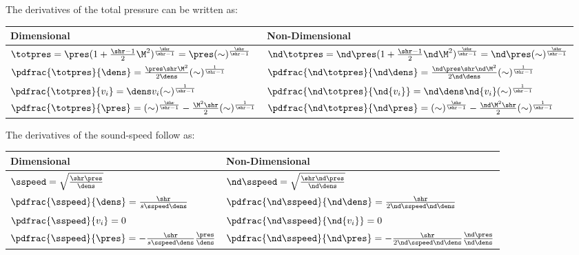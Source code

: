 \documentclass[../main.tex]{subfiles}
\begin{document}
The derivatives of the total pressure  can be written as:
\def\totpress  {$\totpres = \pres (1+\frac{\shr-1}{2} \M^2)^{\frac{\shr}{\shr-1}} = \pres (\sim)^{\frac{\shr}{\shr-1}}$}
\def\ndtotpress      {$\ndtotpres = \ndpres (1+\frac{\shr-1}{2} \ndM^2)^{\frac{\shr}{\shr-1}} = \ndpres (\sim)^{\frac{\shr}{\shr-1}}$}
\def\pdtotpressBYdens{$\pdfrac{\totpres}{\dens} =\frac{\pres \shr \M^2}{2 \dens} (\sim)^{\frac{1}{\shr-1}}$}
\def\pdtotpressBYvel {$\pdfrac{\totpres}{v_i}   = \dens v_i (\sim)^{\frac{1}{\shr-1}}$}
\def\pdtotpressBYpres    {$\pdfrac{\totpres}{\pres} = (\sim)^{\frac{\shr}{\shr-1}}-\frac{\M^2\shr}{2} (\sim)^{\frac{1}{\shr-1}}$}
\def\pdndtotpressBYnddens{$\pdfrac{\ndtotpres}{\nddens}  = \frac{\ndpres \shr \ndM^2}{2 \nddens} (\sim)^{\frac{1}{\shr-1}}$ }
\def\pdndtotpressBYndvel {$\pdfrac{\ndtotpres}{\nd{v_i}} = \nddens \nd{v_i} (\sim)^{\frac{1}{\shr-1}}$}
\def\pdndtotpressBYndpres{$\pdfrac{\ndtotpres}{\ndpres}  = (\sim)^{\frac{\shr}{\shr-1}}-\frac{\ndM^2\shr}{2} (\sim)^{\frac{1}{\shr-1}}$}
\begin{center}
\begin{tabular}{ m{} | m{} }\hline
\rowcolor{black!20} \textbf{Dimensional} &  \textbf{Non-Dimensional} \\ \hline
\totpress & \ndtotpress \\
\pdtotpressBYdens & \pdndtotpressBYnddens \\
\pdtotpressBYvel  & \pdndtotpressBYndvel  \\
\pdtotpressBYpres & \pdndtotpressBYndpres
\end{tabular}
\end{center}


The derivatives of the sound-speed follow as:
\def\sspeedeq{$\sspeed=\sqrt{\frac{\shr\pres}{\dens}}$}
\def\ndsspeedeq{$\ndsspeed=\sqrt{\frac{\shr\ndpres}{\nddens}}$}
\def\pdsspeedBYdens{$\pdfrac{\sspeed}{\dens} = \frac{\shr}{s\sspeed\dens}$}
\def\pdsspeedBYvel {$\pdfrac{\sspeed}{v_i}  = 0$}
\def\pdsspeedBYpres{$\pdfrac{\sspeed}{\pres} = -\frac{\shr}{s\sspeed\dens}\frac{\pres}{\dens}$}
\def\pdndsspeedBYnddens{$\pdfrac{\ndsspeed}{\nddens} = \frac{\shr}{2\ndsspeed\nddens}$}
\def\pdndsspeedBYndvel {$\pdfrac{\ndsspeed}{\nd{v_{i}}}  = 0 $}
\def\pdndsspeedBYndpres{$\pdfrac{\ndsspeed}{\ndpres} = -\frac{\shr}{2\ndsspeed\nddens}\frac{\ndpres}{\nddens}$}
\begin{center}
\begin{tabular}{ m{} | m{} }\hline
\rowcolor{black!20} \textbf{Dimensional} &  \textbf{Non-Dimensional} \\ \hline
\sspeedeq & \ndsspeedeq \\
\pdsspeedBYdens & \pdndsspeedBYnddens \\
\pdsspeedBYvel  & \pdndsspeedBYndvel  \\
\pdsspeedBYpres & \pdndsspeedBYndpres
\end{tabular}
\end{center}
\end{document}
